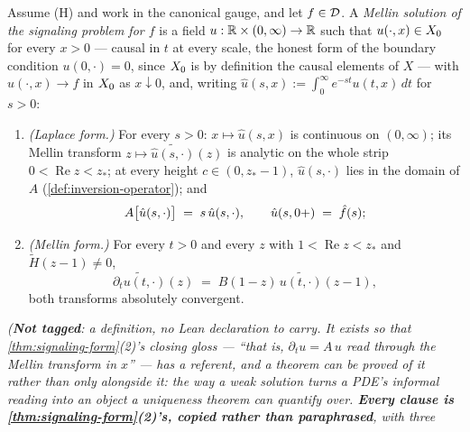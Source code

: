 \begin{definition}\label{def:mellin-solution}
Assume (H) and work in the canonical gauge, and let $f \in \mathcal{D}$. A \emph{Mellin solution of the
signaling problem for $f$} is a field $u : \mathbb{R} \times (0,\infty) \to \mathbb{R}$ such that $u(\cdot, x)
\in X_0$ for every $x > 0$ --- causal in $t$ at every scale, the honest form of the boundary
condition $u(0,\cdot) = 0$, since $X_0$ is by definition the causal elements of $X$ --- with
$u(\cdot, x) \to f$ in $X_0$ as $x \downarrow 0$, and, writing
$\hat u(s,x) := \int_0^\infty e^{-st}u(t,x)\,dt$ for $s > 0$:
\begin{enumerate}
\item \emph{(Laplace form.)} For every $s > 0$: $x \mapsto \hat u(s,x)$ is continuous on
$(0,\infty)$; its Mellin transform $z \mapsto \widetilde{\hat u(s,\cdot)}(z)$ is analytic on the
whole strip $0 < \operatorname{Re} z < z_*$; at every height $c \in (0, z_*-1)$, $\hat u(s,\cdot)$ lies in the
domain of $A$ (\ref{def:inversion-operator}); and
\[
A\bigl[\hat u(s,\cdot)\bigr] \;=\; s\,\hat u(s,\cdot), \qquad \hat u(s, 0{+}) \;=\; \hat f(s);
\]
\item \emph{(Mellin form.)} For every $t > 0$ and every $z$ with $1 < \operatorname{Re} z < z_*$ and
$\tilde H(z-1) \ne 0$,
\[
\widetilde{\partial_t u(t, \cdot)}(z) \;=\; B(1-z)\,\widetilde{u(t,\cdot)}(z-1),
\]
both transforms absolutely convergent.
\end{enumerate}
\statusT\quad\emph{(\textbf{Not tagged}: a definition, no Lean declaration to carry. It exists so
that \ref{thm:signaling-form}(2)'s closing gloss --- ``that is, $\partial_t u = A\,u$ read through
the Mellin transform in $x$'' --- has a referent, and a theorem can be proved \emph{of} it rather
than only alongside it: the way a weak solution turns a PDE's informal reading into an object a
uniqueness theorem can quantify over.
\textbf{Every clause is \ref{thm:signaling-form}(2)'s, copied rather than paraphrased}, with three
}
\end{definition}
